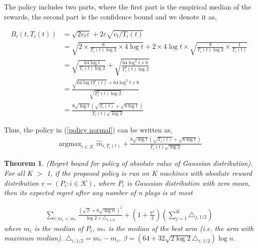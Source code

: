 \documentclass{article}
\DeclareMathOperator*{\argmax}{argmax}
\theoremstyle{plain}
\newtheorem{theo}{Theorem}
\begin{document}
The policy includes two parts, where the first part is the empirical median of the rewards, the second part is the confidence bound and we denote it as,

\begin{align}
\label{B_i(i, T_i(t)) definition}
B_i(t, T_i(t)) &= \sqrt{2v_t \varepsilon} + 2 \varepsilon \sqrt{v_t/T_i(t)}\\
&= \sqrt{2 \times \frac{8}{T_i(t) \log 2} \times 4 \log t} + 2 \times 4 \log t \times \sqrt{\frac{8}{T_i(t) \log 2} \times \frac{1}{T_i(t)}}\\
&= \sqrt{\frac{64 \log t}{T_i(t) \log 2}} + \sqrt{\frac{64 \log^2 t \times 8}{T_i^2(t) \log 2}}\\
&= \frac{\sqrt{64 \log t T__i(t)} + 64 \log^2 t \times 8}{\sqrt{T_i^2(t) \log 2}}\\
\label{B_i(i, T_i(t)) definition 2}
&= \frac{8 \sqrt{\log t} (\sqrt{ T_i(t)} + \sqrt{8\log t})}{T_i(t)  \sqrt{\log 2}}
\end{align}

Thus, the policy in (\ref{policy normal}) can be written as,
\begin{align}
    \argmax_{i \in \mathcal{K}} \hat{m}_{i, T_i(t)} + \frac{8 \sqrt{\log t} (\sqrt{ T_i(t)} + \sqrt{8\log t})}{T_i(t)  \sqrt{\log 2}}
\end{align}

\begin{theo}
(Regret bound for policy of absolute value of Gaussian distribution). \\

For all K $>$ 1, if the proposed policy is run on K machines with absolute reward distribution $v = (P_i: i \in \mathcal{K})$, where $P_i$ is Gaussian distribution with zero mean, then its expected regret after any number of n plays is at most 

\begin{align}
    \sum_{i: m_i < m_\ast} \frac{(\sqrt{\beta} + 8 \sqrt{\log n})^2}{\log 2 \times \triangle_{i, 1/2}} + (1 + \frac{\pi^2}{3}) (\sum_{j=1}^K \triangle_{j, 1/2}) 
\end{align}
where $m_i$ is the median of $P_i$, $m_\ast$ is the median of the best arm (i.e. the arm with maximum median). $\triangle_{i, 1/2} = m_\ast - m_i$, $\beta = (64 + 32 \sqrt{2 \log 2} \triangle_{i,1/2} )\log n$. 
\end{theo}
\end{document}
